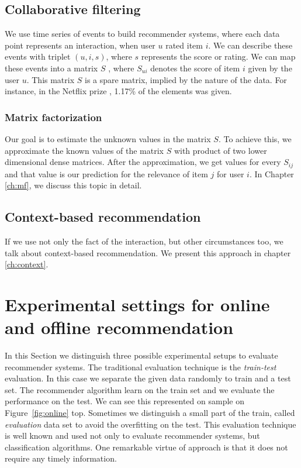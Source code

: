 \subsection{Collaborative filtering}\label{subsec:collab}
We use time series of events to build recommender systems, where each data point 
represents an interaction, when user $u$ rated item $i$. We can describe these events 
with triplet $(u, i, s)$, where $s$ represents the score or rating. We  can map these
events into a matrix $S$ , where $S_{ui}$ denotes the  score of item $i$ given by the
user $u$. This matrix $S$ is a spare matrix, implied by the nature of the data. For 
instance, in the Netflix prize \cite{bennett2007netflix}, 1.17\% of the elements was given. 


\subsubsection{Matrix factorization}\label{subsec:mf}
Our goal is to estimate the unknown values in the matrix $S$. To achieve this, we
approximate the known values of the matrix $S$ with product of two lower dimensional
dense matrices. After the approximation, we get values for every $S_{ij}$ and that 
value is our prediction for the relevance of item $j$ for user $i$. In Chapter \ref{ch:mf}, we
discuss this topic in detail.
 
\subsection{Context-based recommendation}\label{subsec:context}
If we use not only the fact of the interaction, but other circumstances too, we talk about 
context-based recommendation. We present this approach in chapter \ref{ch:context}.

\section{Experimental settings for online and offline recommendation}
In this Section we distinguish three possible experimental setups to evaluate recommender
systems. %
The traditional evaluation technique is the \emph{train-test} evaluation. In this case we
separate the given data  randomly to train and a test set. The recommender algorithm learn on
the train set and we evaluate the performance on the test. We can see this represented on sample on Figure~\ref{fig:online} top. Sometimes we distinguish a small part
of the train, called \emph{evaluation} data set to avoid the overfitting on the test. This evaluation technique is well known and used not only to evaluate recommender systems, but classification algorithms. One remarkable virtue of approach is that it does not require any timely information.

